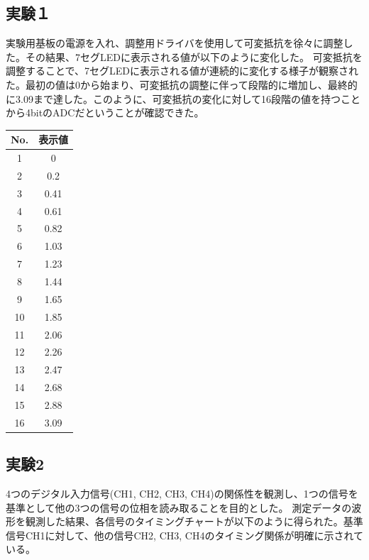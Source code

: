 \documentclass[a4paper,11pt,xelatex,ja=standard]{bxjsarticle}
\begin{document}
    \subsection{実験１}
    実験用基板の電源を入れ、調整用ドライバを使用して可変抵抗を徐々に調整した。その結果、7セグLEDに表示される値が以下のように変化した。
    可変抵抗を調整することで、7セグLEDに表示される値が連続的に変化する様子が観察された。最初の値は0から始まり、可変抵抗の調整に伴って段階的に増加し、最終的に3.09まで達した。このように、可変抵抗の変化に対して16段階の値を持つことから4bitのADCだということが確認できた。


        \begin{tabular}{|c|c|}
            \hline
            No. & 表示値 \\
            \hline
            1 & 0 \\
            \hline
            2 & 0.2 \\
            \hline
            3 & 0.41 \\
            \hline
            4 & 0.61 \\
            \hline
            5 & 0.82 \\
            \hline
            6 & 1.03 \\
            \hline
            7 & 1.23 \\
            \hline
            8 & 1.44 \\
            \hline
            9 & 1.65 \\
            \hline
            10 & 1.85 \\
            \hline
            11 & 2.06 \\
            \hline
            12 & 2.26 \\
            \hline
            13 & 2.47 \\
            \hline
            14 & 2.68 \\
            \hline
            15 & 2.88 \\
            \hline
            16 & 3.09 \\
            \hline
        \end{tabular}
    \subsection{実験2}

        4つのデジタル入力信号(CH1, CH2, CH3, CH4)の関係性を観測し、1つの信号を基準として他の3つの信号の位相を読み取ることを目的とした。
        測定データの波形を観測した結果、各信号のタイミングチャートが以下のように得られた。基準信号CH1に対して、他の信号CH2, CH3, CH4のタイミング関係が明確に示されている。
\end{document}
